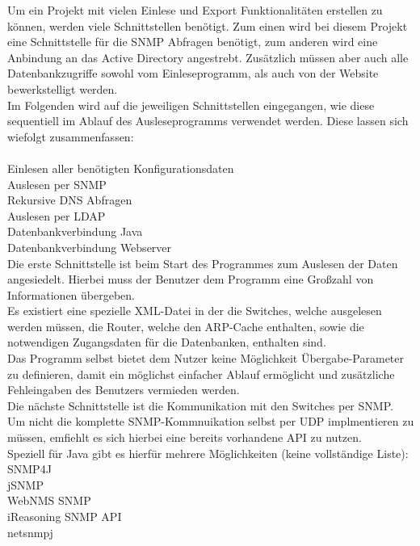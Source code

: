 Um ein Projekt mit vielen Einlese und Export Funktionalitäten erstellen zu können, werden viele Schnittstellen benötigt.
Zum einen wird bei diesem Projekt eine Schnittstelle für die SNMP Abfragen benötigt, zum anderen wird eine Anbindung an das Active Directory angestrebt. Zusätzlich müssen aber auch alle Datenbankzugriffe sowohl vom Einleseprogramm, als auch von der Website bewerkstelligt werden.\\
Im Folgenden wird auf die jeweiligen Schnittstellen eingegangen, wie diese sequentiell im Ablauf des Ausleseprogramms verwendet werden. Diese lassen sich wiefolgt zusammenfassen:\\
\\
Einlesen aller benötigten Konfigurationsdaten\\
Auslesen per SNMP\\
Rekursive DNS Abfragen\\
Auslesen per LDAP\\
Datenbankverbindung Java\\
Datenbankverbindung Webserver\\


Die erste Schnittstelle ist beim Start des Programmes zum Auslesen der Daten angesiedelt. Hierbei muss der Benutzer dem Programm eine Großzahl von Informationen übergeben.\\
Es existiert eine spezielle XML-Datei in der die Switches, welche ausgelesen werden müssen, die Router, welche den ARP-Cache enthalten, sowie die notwendigen Zugangsdaten für die Datenbanken, enthalten sind. \\
Das Programm selbst bietet dem Nutzer keine Möglichkeit Übergabe-Parameter zu definieren, damit ein möglichst einfacher Ablauf ermöglicht und zusätzliche Fehleingaben des Benutzers vermieden werden.\\
Die nächste Schnittstelle ist die Kommunikation mit den Switches per SNMP. Um nicht die komplette SNMP-Kommnuikation selbst per UDP implmentieren zu müssen, emfiehlt es sich hierbei eine bereits vorhandene API zu nutzen.\\
Speziell für Java gibt es hierfür mehrere Möglichkeiten (keine vollständige Liste):\\
SNMP4J\\
jSNMP\\
WebNMS SNMP\\
iReasoning SNMP API\\
netsnmpj\\


